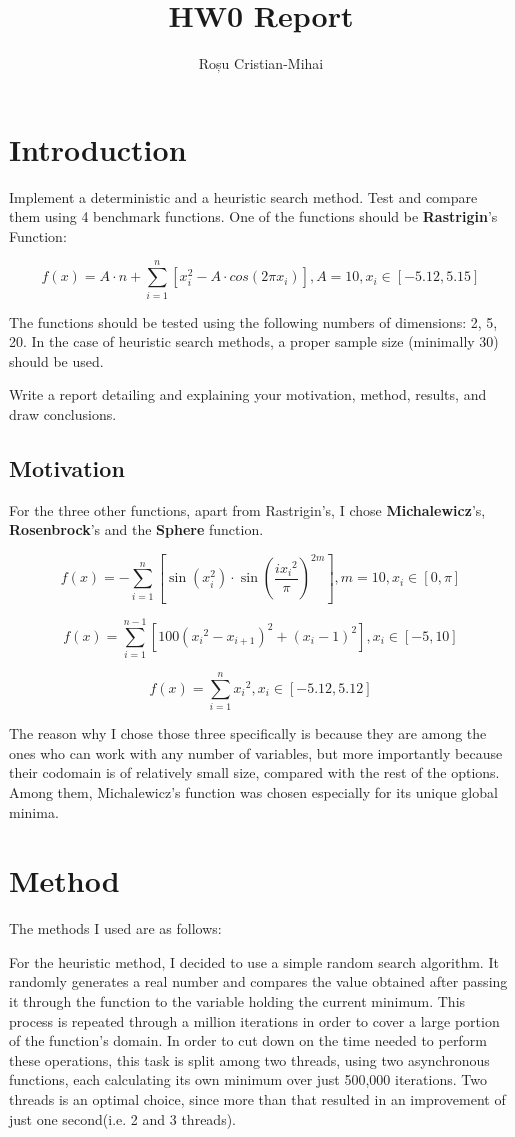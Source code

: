 \documentclass{article}
\author{Roșu Cristian-Mihai}
\title{HW0 Report}
\begin{document}
\maketitle

\section{Introduction}
Implement a deterministic and a heuristic search method.
Test and compare them using 4 benchmark functions.
One of the functions should be \textbf{Rastrigin}'s Function:

$$ f(x) = A \cdot n + \sum_{i=1}^n \left[ x_i^2 - A \cdot cos(2 \pi x_i) \right],
A = 10, x_i \in \left[ -5.12, 5.15 \right]$$

The functions should be tested using the following numbers of dimensions:
2, 5, 20.
In the case of heuristic search methods, a proper sample size (minimally 30) should be used.

Write a report detailing and explaining your motivation, method, results, and draw conclusions.

\subsection{Motivation}
For the three other functions, apart from Rastrigin's, I chose \textbf{Michalewicz}'s, \textbf{Rosenbrock}'s and the \textbf{Sphere} function.

$$ f(x) = - \sum_{i=1}^n \left[ \sin(x_i^2) \cdot \sin(\frac{i{x_i}^2}{\pi})^{2m} \right],
m = 10, x_i \in \left[ 0, \pi \right]$$

$$ f(x) = \sum_{i=1}^{n-1} \left[ 100({x_i}^2-x_{i+1})^2+(x_i-1)^2 \right], x_i \in \left[ -5, 10 \right]$$

$$ f(x) = \sum_{i=1}^n {x_i}^2, x_i \in \left[ -5.12, 5.12 \right]$$

The reason why I chose those three specifically is because they are among the ones who can work with any number of variables, but more importantly because their codomain is of relatively small size, compared with the rest of the options.
Among them, Michalewicz's function was chosen especially for its unique global minima.
\section{Method}
The methods I used are as follows:

For the heuristic method, I decided to use a simple random search algorithm. It randomly generates a real number and compares the value obtained after passing it through the function to the variable holding the current minimum. This process is repeated through a million iterations in order to cover a large portion of the function's domain. In order to cut down on the time needed to perform these operations, this task is split among two threads, using two asynchronous functions, each calculating its own minimum over just 500,000 iterations. Two threads is an optimal choice, since more than that resulted in an improvement of just one second(i.e. 2 and 3 threads).
\end{document}
